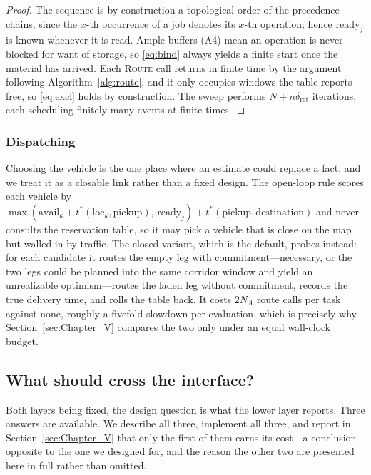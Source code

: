 \documentclass[manuscript,screen,review]{acmart}
\begin{document}
\begin{proof}
The sequence is by construction a topological order of the precedence chains,
since the $x$-th occurrence of a job denotes its $x$-th operation; hence
$\mathrm{ready}_j$ is known whenever it is read. Ample buffers (A4) mean an
operation is never blocked for want of storage, so \eqref{eq:bind} always
yields a finite start once the material has arrived. Each \textsc{Route} call
returns in finite time by the argument following Algorithm~\ref{alg:route}, and
it only occupies windows the table reports free, so \eqref{eq:excl} holds by
construction. The sweep performs $N+n\delta_{\mathrm{ret}}$ iterations, each
scheduling finitely many events at finite times.
\end{proof}

\subsubsection{Dispatching}
\label{sec:dispatch}
Choosing the vehicle is the one place where an estimate could replace a fact,
and we treat it as a closable link rather than a fixed design. The open-loop
rule scores each vehicle by
$\max(\mathrm{avail}_k+t^{*}(\mathrm{loc}_k,\text{pickup}),\,
\mathrm{ready}_j)+t^{*}(\text{pickup},\text{destination})$
and never consults the reservation table, so it may pick a vehicle that is
close on the map but walled in by traffic. The closed variant, which is the
default, probes instead: for each candidate it routes the empty leg with
commitment---necessary, or the two legs could be planned into the same corridor
window and yield an unrealizable optimism---routes the laden leg without
commitment, records the true delivery time, and rolls the table back. It costs
$2N_A$ route calls per task against none, roughly a fivefold slowdown per
evaluation, which is precisely why Section~\ref{sec:Chapter_V} compares the two
only under an equal wall-clock budget.

\subsection{What should cross the interface?}
\label{sec:interface}

Both layers being fixed, the design question is what the lower layer reports.
Three answers are available. We describe all three, implement all three, and
report in Section~\ref{sec:Chapter_V} that only the first of them earns its
cost---a conclusion opposite to the one we designed for, and the reason the
other two are presented here in full rather than omitted.
\end{document}
